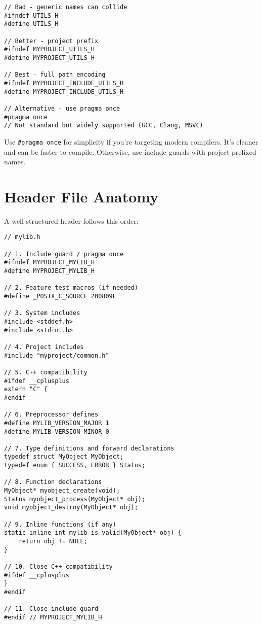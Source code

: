 \begin{lstlisting}
// Bad - generic names can collide
#ifndef UTILS_H
#define UTILS_H

// Better - project prefix
#ifndef MYPROJECT_UTILS_H
#define MYPROJECT_UTILS_H

// Best - full path encoding
#ifndef MYPROJECT_INCLUDE_UTILS_H
#define MYPROJECT_INCLUDE_UTILS_H

// Alternative - use pragma once
#pragma once
// Not standard but widely supported (GCC, Clang, MSVC)
\end{lstlisting}

\begin{tipbox}
Use \texttt{\#pragma once} for simplicity if you're targeting modern compilers. It's cleaner and can be faster to compile. Otherwise, use include guards with project-prefixed names.
\end{tipbox}

\section{Header File Anatomy}

A well-structured header follows this order:

\begin{lstlisting}
// mylib.h

// 1. Include guard / pragma once
#ifndef MYPROJECT_MYLIB_H
#define MYPROJECT_MYLIB_H

// 2. Feature test macros (if needed)
#define _POSIX_C_SOURCE 200809L

// 3. System includes
#include <stddef.h>
#include <stdint.h>

// 4. Project includes
#include "myproject/common.h"

// 5. C++ compatibility
#ifdef __cplusplus
extern "C" {
#endif

// 6. Preprocessor defines
#define MYLIB_VERSION_MAJOR 1
#define MYLIB_VERSION_MINOR 0

// 7. Type definitions and forward declarations
typedef struct MyObject MyObject;
typedef enum { SUCCESS, ERROR } Status;

// 8. Function declarations
MyObject* myobject_create(void);
Status myobject_process(MyObject* obj);
void myobject_destroy(MyObject* obj);

// 9. Inline functions (if any)
static inline int mylib_is_valid(MyObject* obj) {
    return obj != NULL;
}

// 10. Close C++ compatibility
#ifdef __cplusplus
}
#endif

// 11. Close include guard
#endif // MYPROJECT_MYLIB_H
\end{lstlisting}

